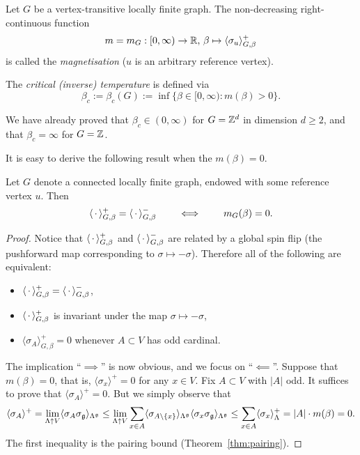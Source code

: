 \begin{definition}
    Let $G$ be a vertex-transitive locally finite graph.
    The non-decreasing right-continuous function
    \[
        m=m_G:[0,\infty)\to\mathbb R,\,\beta\mapsto\langle\sigma_u\rangle_{G,\beta}^+
    \]
    is called the \emph{magnetisation} ($u$ is an arbitrary reference vertex).

    The \emph{critical (inverse) temperature} is defined via
    \[
        \beta_c:=\beta_c(G):=\inf\{\beta\in[0,\infty):m(\beta)>0\}.
    \]
\end{definition}

We have already proved that $\beta_c\in(0,\infty)$ for $G=\mathbb Z^d$
in dimension $d\geq 2$,
and that $\beta_c=\infty$ for $G=\mathbb Z$.

It is easy to derive the following result when the $m(\beta)=0$.

\begin{theorem} 
    \label{thm:vanishing_magnetisation}
    Let $G$ denote a connected locally finite graph,
    endowed with some reference vertex $u$.
    Then 
    \[
        \langle\,\cdot\,\rangle_{G,\beta}^+=\langle\,\cdot\,\rangle_{G,\beta}^-
        \qquad
        \iff 
        \qquad
        m_G(\beta)=0.
    \]
\end{theorem}



\begin{proof}
    Notice that $\langle\,\cdot\,\rangle_{G,\beta}^+$ and $\langle\,\cdot\,\rangle_{G,\beta}^-$ are related
    by a global spin flip (the pushforward map corresponding to $\sigma\mapsto-\sigma$).
    Therefore all of the following are equivalent:
    \begin{itemize}
        \item $\langle\,\cdot\,\rangle_{G,\beta}^+=\langle\,\cdot\,\rangle_{G,\beta}^-$,
        \item $\langle\,\cdot\,\rangle_{G,\beta}^+$ is invariant under the map $\sigma\mapsto-\sigma$,
        \item $\langle\sigma_A\rangle_{G,\beta}^+=0$ whenever $A\subset V$ has odd cardinal.
    \end{itemize}

    The implication ``$\implies$'' is now obvious, and we focus on  ``$\impliedby$''.
    Suppose that $m(\beta)=0$,
    that is, $\langle\sigma_x\rangle^+=0$ for any $x\in V$.
    Fix $A\subset V$ with $|A|$ odd.
    It suffices to prove that $\langle\sigma_A\rangle^+=0$.
    But we simply observe that
    \[
        \langle\sigma_A\rangle^+
        =
        \lim_{\Lambda\uparrow V}
        \langle\sigma_A\sigma_\mathfrak g\rangle_{\Lambda^\mathfrak g}
        \leq
        \lim_{\Lambda\uparrow V}
        \sum_{x\in A}
        \langle\sigma_{A\setminus\{x\}}\rangle_{\Lambda^\mathfrak g}
        \langle\sigma_x\sigma_\mathfrak g\rangle_{\Lambda^\mathfrak g}
        \leq
        \sum_{x\in A}
        \langle\sigma_x\rangle_{\Lambda}^+= |A|\cdot m(\beta)=0.
    \]
    The first inequality is the pairing bound (Theorem~\ref{thm:pairing}).
\end{proof}

